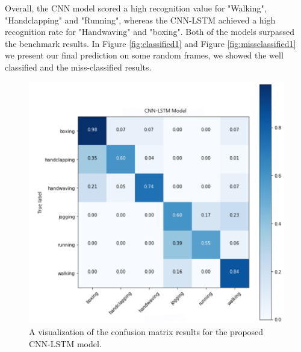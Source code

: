 Overall, the CNN model scored a high recognition value for "Walking", "Handclapping" and "Running", whereas the CNN-LSTM achieved a high recognition rate for "Handwaving" and "boxing". Both of the models surpassed the benchmark results. In Figure \ref{fig:classified1} and Figure \ref{fig:missclassified1} we present our final prediction on some random frames, we showed the well classified and the miss-classified results. 
\begin{figure}[ht]
\centering
\includegraphics[width=1.0\columnwidth]{Figures/cnnlstmodel.png}
\decoRule
\caption[A visualization of the confusion matrix results for the proposed CNN-LSTM model.]{A visualization of the confusion matrix results for the proposed CNN-LSTM model.}
\label{fig:cmsnnlstm}
\end{figure}


